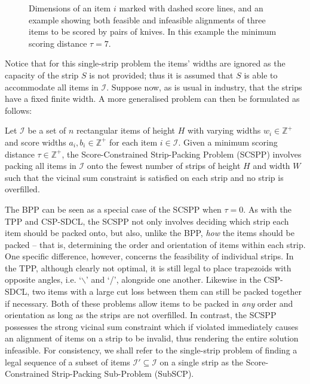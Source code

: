 \documentclass{elsarticle}
\begin{document}
\begin{figure}[H]	
	\centering
	
	\caption{Dimensions of an item $i$ marked with dashed score lines, and an example showing both feasible and infeasible alignments of three items to be scored by pairs of knives. In this example the minimum scoring distance $\tau = 7$.}	
	\label{fig:itemsknife}
\end{figure}

\noindent Notice that for this single-strip problem the items' widths are ignored as the capacity of the strip $S$ is not provided; thus it is assumed that $S$ is able to accommodate all items in $\mathcal{I}$.  Suppose now, as is usual in industry, that the strips have a fixed finite width. A more generalised problem can then be formulated as follows:

\begin{definition}
	\label{defn:scspp}
	Let $\mathcal{I}$ be a set of $n$ rectangular items of height $H$ with varying widths $w_i \in \mathbb{Z}^+$ and score widths $a_i, b_i \in \mathbb{Z}^+$ for each item $i \in \mathcal{I}$. Given a minimum scoring distance $\tau \in \mathbb{Z}^+$, the Score-Constrained Strip-Packing Problem (SCSPP) involves packing all items in $\mathcal{I}$ onto the fewest number of strips of height $H$ and width $W$ such that the vicinal sum constraint is satisfied on each strip and no strip is overfilled.
\end{definition}

\noindent The BPP can be seen as a special case of the SCSPP when $\tau = 0$. As with the TPP and CSP-SDCL, the SCSPP not only involves deciding which strip each item should be packed onto, but also, unlike the BPP, \emph{how} the items should be packed -- that is, determining the order and orientation of items within each strip. One specific difference, however, concerns the feasibility of individual strips. In the TPP, although clearly not optimal, it is still legal to place trapezoids with opposite angles, i.e. `$\backslash$' and `/', alongside one another. Likewise in the CSP-SDCL, two items with a large cut loss between them can still be packed together if necessary. Both of these problems allow items to be packed in \emph{any} order and orientation as long as the strips are not overfilled. In contrast, the SCSPP possesses the strong vicinal sum constraint which if violated immediately causes an alignment of items on a strip to be invalid, thus rendering the entire solution infeasible. For consistency, we shall refer to the single-strip problem of finding a legal sequence of a subset of items $\mathcal{I}' \subseteq \mathcal{I}$ on a single strip as the Score-Constrained Strip-Packing Sub-Problem (SubSCP).
\end{document}

